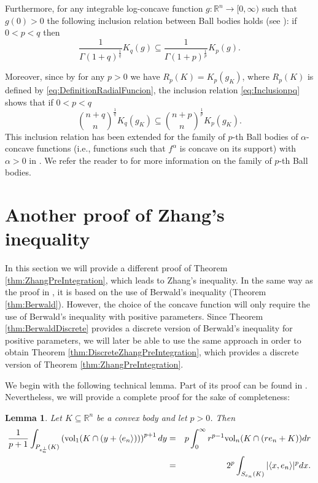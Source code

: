 \documentclass[10pt]{amsart}
\newtheorem{lemma}[thm]{Lemma}
\def\R{\mathbb{R}}
\def\vol{\mathrm{vol}}
\numberwithin{equation}{section}
\begin{document}
Furthermore, for any integrable log-concave function $g:\R^n\to[0,\infty)$ such that $g(0)>0$ the following inclusion relation between Ball bodies holds (see \cite[Proposition 2.5.7]{BGVV}): if $0<p<q$ then
$$
\frac{1}{\Gamma (1+q)^\frac{1}{q}} K_q (g) \subseteq  \frac{1}{\Gamma (1+p)^\frac{1}{p}}K_p (g).
$$


Moreover, since by \cite[Lemma 3.1]{GZ} for any $p>0$ we have  $R_p(K)=K_p(g_K)$, where $R_p(K)$ is defined by \eqref{eq:DefinitionRadialFuncion}, the inclusion relation \eqref{eq:Inclusionpq} shows that if $0<p<q$
\begin{equation}\label{eq:inclusionBallBodiesCovariogram}
{{n+q}\choose{n}}^\frac{1}{q}K_q (g_K)\subseteq{{n+p}\choose{n}}^\frac{1}{p}K_p(g_K).
\end{equation}
This inclusion relation has been extended for the family of $p$-th Ball bodies of $\alpha$-concave functions (i.e., functions such that $f^\alpha$ is concave on its support) with $\alpha>0$ in  \cite[Theorem 1.2]{Ma}.
We refer the reader to \cite[Section 2.5]{BGVV} for more information on the family of $p$-th Ball bodies.

\section{Another proof of Zhang's inequality} \label{sec:NewProof}

In this section we will provide a different proof of Theorem \ref{thm:ZhangPreIntegration}, which leads to Zhang's inequality. In the same way as the proof in \cite{GZ}, it is based on the use of Berwald's inequality (Theorem \ref{thm:Berwald}). However, the choice of the concave function will only require the use of Berwald's inequality with positive parameters. Since Theorem \ref{thm:BerwaldDiscrete} provides a discrete version of Berwald's inequality for positive parameters, we will later be able to use the same approach in order to obtain Theorem \ref{thm:DiscreteZhangPreIntegration}, which provides a discrete version of Theorem \ref{thm:ZhangPreIntegration}.

We begin with the following technical lemma. Part of its proof can be found in \cite[Lemma 2.1 and Lemma 3.1]{GZ}. Nevertheless, we will provide a complete proof for the sake of completeness:

\begin{lemma}\label{lem:IdentitiesIntegral}
Let $K\subseteq\R^n$ be a convex body and let $p>0$. Then
\begin{eqnarray*}
\frac{1}{p+1}\int_{P_{e_n^\perp}(K)}\left(\vol_1(K\cap (y+\langle e_n\rangle))\right)^{p+1}dy&=&p\int_0^{\infty}r^{p-1}\vol_n(K\cap(re_n+K))dr\cr
&=&2^p\int_{S_{e_n}(K)}|\langle x,e_n\rangle|^pdx.
\end{eqnarray*}
\end{lemma}
\end{document}
